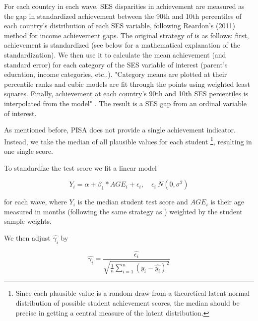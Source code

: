 \documentclass[11pt, a4paper]{article}\usepackage[]{graphicx}\usepackage[]{color}
\begin{document}
For each country in each wave, SES disparities in achievement are measured as the gap in standardized achievement between the 90th and 10th percentiles of each country’s distribution of each SES variable, following Reardon’s (2011) method for income achievement gaps. The original strategy of \citet{reardon2011} is as follows: first, achievement is standardized (see below for a mathematical explanation of the standardization). We then use it to calculate the mean achievement (and standard error) for each category of the SES variable of interest (parent's education, income categories, etc..). "Category means are plotted at their percentile ranks and cubic models are fit through the points using weighted least squares. Finally, achievement at each country’s 90th and 10th SES percentiles is interpolated from the model" \citep{anna2016_global}. The result is a SES gap from an ordinal variable of interest.

As mentioned before, PISA does not provide a single achievement indicator. Instead, we take the median of all plausible values for each student \footnote{Since each plausible value is a random draw from a theoretical latent normal distribution of possible student achievement scores, the median should be precise in getting a central measure of the latent distribution.}, resulting in one single score.

To standardize the test score we fit a linear model

\begin{equation}
Y_i = \alpha + \beta_1 * AGE_i + \epsilon_i, \quad \epsilon_i ~ N(0, \sigma^2)
\end{equation}

for each wave, where \begin{math}Y_i\end{math} is the median student test score and \begin{math}AGE_i\end{math} is their age measured in months (following the same strategy as \citet{reardon2011}) weighted by the student sample weights.

We then adjust \begin{math} \hat{\gamma_i} \end{math} by

\begin{equation}
\hat{\gamma_i} = \frac{\hat{\epsilon_i}}{\sqrt{\frac{1}{n} \sum_{i=1}^{n} (y_i - \hat{y_i})^2}}
\end{equation}
\end{document}
